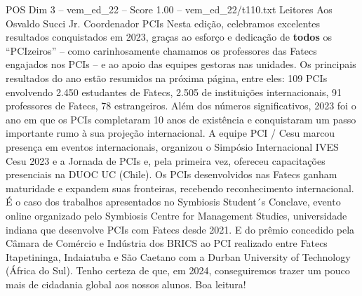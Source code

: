 \begin{textsample}{POS Dim 3 – vem\_ed\_22 – Score 1.00 – vem\_ed\_22/t110.txt}  \label{ex:f3_pos_044}
Leitores Aos Osvaldo Succi Jr.
Coordenador PCIs Nesta edição, celebramos excelentes resultados conquistados em 2023, graças ao esforço e dedicação de \textbf{todos} os “PCIzeiros” – como carinhosamente chamamos os professores das Fatecs engajados nos PCIs – e ao apoio das equipes gestoras nas unidades.
Os principais resultados do ano estão resumidos na próxima página, entre eles: 109 PCIs envolvendo 2.450 estudantes de Fatecs, 2.505 de instituições internacionais, 91 professores de Fatecs, 78 estrangeiros.
Além dos números significativos, 2023 foi o ano em que os PCIs completaram 10 anos de existência e conquistaram um passo importante rumo à sua projeção internacional.
A equipe PCI / Cesu marcou presença em eventos internacionais, organizou o Simpósio Internacional IVES Cesu 2023 e a Jornada de PCIs e, pela primeira vez, ofereceu capacitações presenciais na DUOC UC (Chile).
Os PCIs desenvolvidos nas Fatecs ganham maturidade e expandem suas fronteiras, recebendo reconhecimento internacional.
É o caso dos trabalhos apresentados no Symbiosis Student´s Conclave, evento online organizado pelo Symbiosis Centre for Management Studies, universidade indiana que desenvolve PCIs com Fatecs desde 2021.
E do prêmio concedido pela Câmara de Comércio e Indústria dos BRICS ao PCI realizado entre Fatecs Itapetininga, Indaiatuba e São Caetano com a Durban University of Technology (África do Sul).
Tenho certeza de que, em 2024, conseguiremos trazer um pouco mais de cidadania global aos nossos alunos.
Boa leitura!

\end{textsample}
